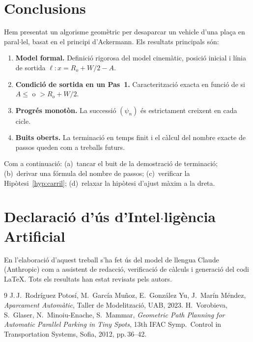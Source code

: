 \documentclass[11pt, a4paper]{article}
\theoremstyle{plain}
\theoremstyle{definition}
\newcommand{\Ro}{R_o}
\begin{document}
\section{Conclusions}\label{sec:conclusions}

Hem presentat un algorisme geom\`etric per desaparcar un vehicle d'una
pla\c{c}a en paral$\cdot$lel, basat en el principi d'Ackermann. Els resultats
principals s\'on:
\begin{enumerate}[noitemsep]
\item \textbf{Model formal.} Definici\'o rigorosa del model cinem\`atic,
  posici\'o inicial i l\'inia de sortida $\ell: x=\Ro+W/2-A$.
\item \textbf{Condici\'o de sortida en un Pas~1.}
  Caracteritzaci\'o exacta en funci\'o de si $A\leq$ o $>\Ro+W/2$.
\item \textbf{Progr\'es monot\`on.} La successi\'o $(\psi_n)$ \'es
  estrictament creixent en cada cicle.
\item \textbf{Buits oberts.} La terminaci\'o en temps finit i el
  c\`alcul del nombre exacte de passos queden com a treballs futurs.
\end{enumerate}

Com a continuaci\'o: (a)~tancar el buit de la demostraci\'o de terminaci\'o;
(b)~derivar una f\'ormula del nombre de passos; (c)~verificar la
Hip\`otesi~\ref{hyp:carril}; (d)~relaxar la hip\`otesi d'ajust m\`axim a
la dreta.

\section*{Declaraci\'o d'\'us d'Intel$\cdot$lig\`encia Artificial}
En l'elaboraci\'o d'aquest treball s'ha fet \'us del model de llengua Claude
(Anthropic) com a assistent de redacci\'o, verificaci\'o de c\`alculs i
generaci\'o del codi \LaTeX. Tots els resultats han estat revisats pels autors.

\begin{thebibliography}{9}
J.\,J.~Rodr\'iguez Potosí, M.~Garc\'ia Mu\~noz, E.~Gonz\'alez Yu,
J.~Mar\'in M\'endez,
\textit{Aparcament Autom\`atic},
Taller de Modelitzaci\'o, UAB, 2023.
H.~Vorobieva, S.~Glaser, N.~Minoiu-Enache, S.~Mammar,
\textit{Geometric Path Planning for Automatic Parallel Parking in Tiny Spots},
13th IFAC Symp.\ Control in Transportation Systems, Sofia, 2012, pp.\,36--42.
\end{thebibliography}
\end{document}
